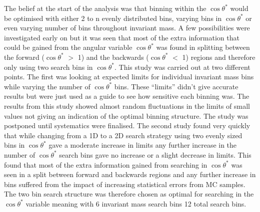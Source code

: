 	The belief at the start of the analysis was that binning within the $\cos{\theta^{*}}$ would be optimised with either 2 to n evenly distributed bins, varying bins in $\cos{\theta^{*}}$ or even varying number of bins throughout invariant mass. A few possibilities were investigated early on but it was seen that most of the extra information that could be gained from the angular variable $\cos{\theta^{*}}$ was found in splitting between the forward ($\cos{\theta^{*}}$ $>$ 1) and the backwards ($\cos{\theta^{*}}$ $<$ 1) regions and therefore only using two search bins in $\cos{\theta^{*}}$. This study was carried out at two different points. The first was looking at expected limits for individual invariant mass bins while varying the number of $\cos{\theta^{*}}$ bins. These ``limits'' didn't give accurate results but were just used as a guide to see how sensitive each binning was. The results from this study showed almost random fluctuations in the limits of small values not giving an indication of the optimal binning structure. The study was postponed until systematics were finalised. The second study found very quickly that while changing from a 1D to a 2D search strategy using two evenly sized bins in $\cos{\theta^{*}}$ gave a moderate increase in limits any further increase in the number of $\cos{\theta^{*}}$ search bins gave no increase or a slight decrease in limits. This found that most of the extra information gained from searching in $\cos{\theta^{*}}$ was seen in a split between forward and backwards regions and any further increase in bins suffered from the impact of increasing statistical errors from MC samples. The two bin search structure was therefore chosen as optimal for searching in the $\cos{\theta^{*}}$ variable meaning with 6 invariant mass search bins 12 total search bins. 







